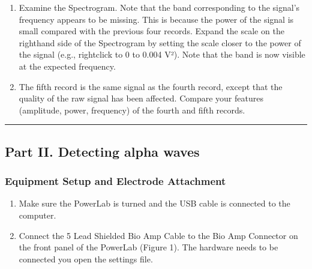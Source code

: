 \documentclass[letterpaper,10pt,english]{jupyterBook}
\begin{document}
\begin{enumerate}
\sphinxAtStartPar
{}

\sphinxAtStartPar
{}

\item {} 
\sphinxAtStartPar
Examine the Spectrogram. Note that the band corresponding to the signal’s frequency appears to be missing. This is because the power of the signal is small compared with the previous four records. Expand the scale on the right\sphinxhyphen{}hand side of the Spectrogram by setting the scale closer to the power of the signal (e.g., right\sphinxhyphen{}click  to 0 to 0.004 V²). Note that the band is now visible at the expected frequency.

\sphinxAtStartPar
{} 

\item {} 
\sphinxAtStartPar
The fifth record is the same signal as the fourth record, except that the quality of the raw signal has been affected. Compare your features (amplitude, power, frequency) of the fourth and fifth records.

\sphinxAtStartPar
{}

\end{enumerate}


\bigskip\hrule\bigskip



\subsection{Part II. Detecting alpha waves}
\label{\detokenize{EEG:part-ii-detecting-alpha-waves}}

\subsubsection{Equipment Setup and Electrode Attachment}
\label{\detokenize{EEG:equipment-setup-and-electrode-attachment}}\begin{enumerate}
%
\item {} 
\sphinxAtStartPar
Make sure the PowerLab is turned  and the USB cable is connected to the computer.

\item {} 
\sphinxAtStartPar
Connect the 5 Lead Shielded Bio Amp Cable to the Bio Amp Connector on the front panel of the PowerLab (Figure 1). The hardware needs to be connected  you open the settings file.

\end{enumerate}
\end{document}
